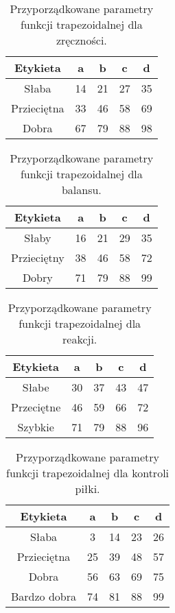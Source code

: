 \documentclass{classrep}
\begin{document}
\begin{table}[H]
	\centering
	\begin{tabular}{c c c c c} 
		\hline
		\textbf{Etykieta} & \textbf{a} & \textbf{b} & \textbf{c} &  \textbf{d} \\ [0.5ex] 
		\hline
		\hline 
		Słaba & 14 & 21 & 27 & 35 \\ 
		Przieciętna & 33 & 46 & 58 & 69 \\
		Dobra & 67 & 79 & 88 & 98 \\
		\hline
	\end{tabular}
	\caption{Przyporządkowane parametry funkcji trapezoidalnej dla zręczności.}
\end{table}

\begin{table}[H]
	\centering
	\begin{tabular}{c c c c c} 
		\hline
		\textbf{Etykieta} & \textbf{a} & \textbf{b} & \textbf{c} &  \textbf{d} \\ [0.5ex] 
		\hline
		\hline 
		Słaby & 16 & 21 & 29 & 35 \\ 
		Przieciętny & 38 & 46 & 58 & 72 \\
		Dobry & 71 & 79 & 88 & 99 \\
		\hline
	\end{tabular}
	\caption{Przyporządkowane parametry funkcji trapezoidalnej dla balansu.}
\end{table}

\begin{table}[H]
	\centering
	\begin{tabular}{c c c c c} 
		\hline
		\textbf{Etykieta} & \textbf{a} & \textbf{b} & \textbf{c} &  \textbf{d} \\ [0.5ex] 
		\hline
		\hline 
		Słabe & 30 & 37 & 43 & 47 \\ 
		Przeciętne & 46 & 59 & 66 & 72 \\
		Szybkie & 71 & 79 & 88 & 96 \\
		\hline
	\end{tabular}
	\caption{Przyporządkowane parametry funkcji trapezoidalnej dla reakcji.}
\end{table}

\begin{table}[H]
	\centering
	\begin{tabular}{c c c c c} 
		\hline
		\textbf{Etykieta} & \textbf{a} & \textbf{b} & \textbf{c} &  \textbf{d} \\ [0.5ex] 
		\hline
		\hline 
		Słaba & 3 & 14 & 23 & 26 \\ 
		Przieciętna & 25 & 39 & 48 & 57 \\
		Dobra & 56 & 63 & 69 & 75 \\
		Bardzo dobra & 74 & 81 & 88 & 99 \\
		\hline
	\end{tabular}
	\caption{Przyporządkowane parametry funkcji trapezoidalnej dla kontroli piłki.}
\end{table}
\end{document}
